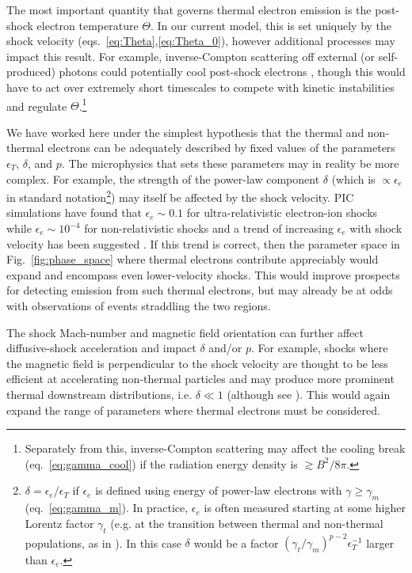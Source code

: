 \documentclass[twocolumn]{aastex63}
\begin{document}
The most important quantity that governs thermal electron emission is the post-shock electron temperature $\Theta$. In our current model, this is set uniquely by the shock velocity (eqs.~\ref{eq:Theta},\ref{eq:Theta_0}), however additional processes may impact this result. For example, inverse-Compton scattering off external (or self-produced) photons could potentially cool post-shock electrons \citep[e.g.][]{Katz+11,Margalit+21}, though this would have to act over extremely short timescales to compete with kinetic instabilities and regulate $\Theta$.\footnote{Separately from this, inverse-Compton scattering may affect the cooling break (eq.~\ref{eq:gamma_cool}) if the radiation energy density is $\gtrsim B^2/8\pi$.}

We have worked here under the simplest hypothesis that the thermal and non-thermal electrons can be adequately described by fixed values of the parameters $\epsilon_T$, $\delta$, and $p$. The microphysics that sets these parameters may in reality be more complex. For example, the strength of the power-law component $\delta$ (which is $\propto \epsilon_e$ in standard notation\footnote{
$\delta = \epsilon_e/\epsilon_T$ if $\epsilon_e$ 
is defined using energy of 
power-law electrons with $\gamma \geq \gamma_m$ (eq.~\ref{eq:gamma_m}). In practice, $\epsilon_e$ is often measured starting at some higher Lorentz factor $\gamma_t$ (e.g. at the transition between thermal and non-thermal populations, as in \citealt{Giannios&Spitkovsky09}). 
In this case $\delta$ would be a factor $(\gamma_t/\gamma_m)^{p-2} \epsilon_T^{-1}$ larger than $\epsilon_e$.
}) may itself be affected by the shock velocity. 
PIC simulations have found that $\epsilon_e \sim 0.1$ for ultra-relativistic electron-ion shocks \citep{Sironi&Spitkovsky11} while $\epsilon_e \sim 10^{-4}$ for non-relativistic shocks \citep{Park+15} and a trend of increasing $\epsilon_e$ with shock velocity has been suggested \citep[e.g.][]{Crumley+19}.
If this trend is correct, then the parameter space in Fig.~\ref{fig:phase_space} where thermal electrons contribute appreciably would expand and encompass even lower-velocity shocks. This would improve prospects for detecting emission from such thermal electrons, but may already be at odds with observations of events straddling the two regions. 

The shock Mach-number and magnetic field orientation can further affect diffusive-shock acceleration and impact $\delta$ and/or $p$. For example, shocks where the magnetic field is perpendicular to the shock velocity are thought to be less efficient at accelerating non-thermal particles \citep[e.g.][]{Sironi&Spitkovsky09} and may produce more prominent thermal downstream distributions, i.e. $\delta \ll 1$ (although see \citealt{Xu+20,Kumar&Reville21}). This would again expand the range of parameters where thermal electrons must be considered.
\end{document}
